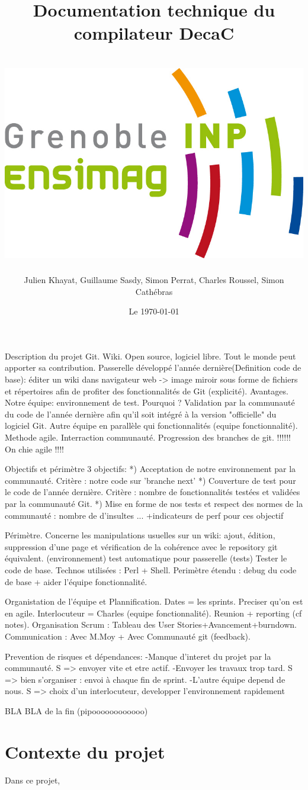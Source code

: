 \documentclass[11pt]{article}
\title{Documentation technique du compilateur DecaC\\
~\\
\includegraphics[scale=0.75]{logo_ensimag.jpg} 
}
\author{Julien Khayat, Guillaume Sasdy, Simon Perrat, Charles Roussel, Simon Cathébras}
\date{Le \today}
\begin{document}
Description du projet
Git. Wiki. Open source, logiciel libre. Tout le monde peut apporter sa contribution. Passerelle développé l'année dernière(Definition code de base):  éditer un wiki dans navigateur web -> image miroir sous forme de fichiers et répertoires afin de profiter des                fonctionnalités de Git (explicité). Avantages.
Notre équipe: environnement de test. Pourquoi ? Validation par la communauté du code de l'année dernière afin qu'il soit     intégré à la version "officielle" du logiciel Git.
Autre équipe en parallèle qui fonctionnalités (equipe fonctionnalité).
Methode agile. Interraction communauté. Progression des branches de git.
!!!!!! On chie agile !!!!

Objectifs et périmètre
3 objectifs:
*) Acceptation de notre environnement par la communauté. Critère : notre code sur 'branche next'
*) Couverture de test pour le code de l'année dernière. Critère : nombre de fonctionnalités testées et validées par la       communauté Git.
*) Mise en forme de nos tests et respect des normes de la communauté : nombre de d'insultes ...
+indicateurs de perf pour ces objectif

Périmètre. Concerne les manipulations usuelles sur un wiki: ajout, édition, suppression d'une page et vérification de la     cohérence avec le repository git équivalent. (environnement)
test automatique pour passerelle (tests)
Tester le code de base. Technos utilisées : Perl + Shell.
Perimètre étendu : debug du code de base + aider l'équipe fonctionnalité.

Organistation de l'équipe et Plannification.
	Dates = les sprints.
	Preciser qu'on est en agile.
	Interlocuteur = Charles (equipe fonctionnalité).
	Reunion + reporting (cf notes).
	Organisation Scrum : Tableau des User Stories+Avancement+burndown.
	Communication : Avec M.Moy + Avec Communauté git (feedback).
	
	Prevention de risques et dépendances:
		-Manque d'interet du projet par la communauté. S => envoyer vite et 		etre actif.
		-Envoyer les travaux trop tard. S => bien s'organiser : envoi à 			chaque fin de sprint.
		-L'autre équipe depend de nous. S => choix d'un interlocuteur, 				developper l'environnement rapidement
	
BLA BLA de la fin (pipoooooooooooo)

	
\section{Contexte du projet}
Dans ce projet, 
\end{document}
